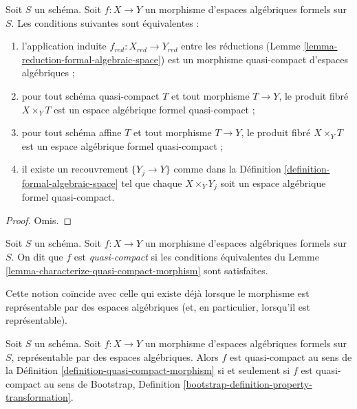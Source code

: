 \begin{lemma}
\label{lemma-characterize-quasi-compact-morphism}
Soit $S$ un schéma. Soit $f : X \to Y$ un morphisme d'espaces algébriques
formels sur $S$. Les conditions suivantes sont équivalentes :
\begin{enumerate}
\item l'application induite $f_{red} : X_{red} \to Y_{red}$ entre les réductions
(Lemme \ref{lemma-reduction-formal-algebraic-space}) est un morphisme
quasi-compact d'espaces algébriques ;
\item pour tout schéma quasi-compact $T$ et tout morphisme $T \to Y$,
le produit fibré $X \times_Y T$ est un espace algébrique formel
quasi-compact ;
\item pour tout schéma affine $T$ et tout morphisme $T \to Y$,
le produit fibré $X \times_Y T$ est un espace algébrique formel
quasi-compact ;
\item il existe un recouvrement $\{Y_j \to Y\}$ comme dans la
Définition \ref{definition-formal-algebraic-space}
tel que chaque $X \times_Y Y_j$ soit un espace algébrique formel quasi-compact.
\end{enumerate}
\end{lemma}

\begin{proof}
Omis.
\end{proof}

\begin{definition}
\label{definition-quasi-compact-morphism}
Soit $S$ un schéma. Soit $f : X \to Y$ un morphisme
d'espaces algébriques formels sur $S$.
On dit que $f$ est {\it quasi-compact} si les conditions équivalentes du
Lemme \ref{lemma-characterize-quasi-compact-morphism} sont satisfaites.
\end{definition}

\noindent
Cette notion coïncide avec celle qui existe déjà lorsque le morphisme
est représentable par des espaces algébriques (et, en particulier, lorsqu'il est
représentable).

\begin{lemma}
\label{lemma-quasi-compact-representable}
Soit $S$ un schéma. Soit $f : X \to Y$ un morphisme d'espaces algébriques
formels sur $S$, représentable par des espaces algébriques.
Alors $f$ est quasi-compact au sens de la
Définition \ref{definition-quasi-compact-morphism}
si et seulement si $f$ est quasi-compact au sens de
Bootstrap, Definition \ref{bootstrap-definition-property-transformation}.
\end{lemma}

